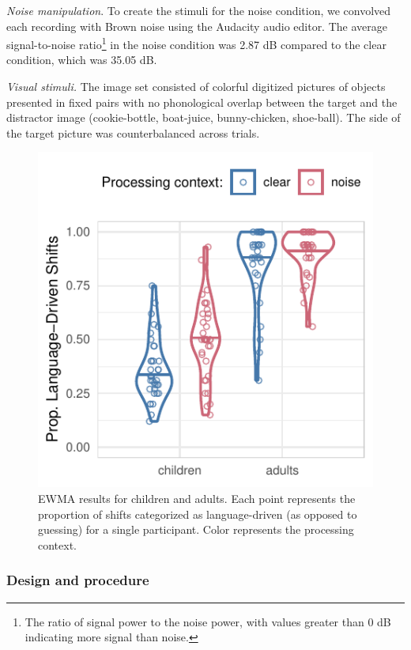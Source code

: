 \documentclass[10pt, letterpaper]{article}
\newenvironment{CodeChunk}{}{}
\begin{document}
\emph{Noise manipulation}. To create the stimuli for the noise
condition, we convolved each recording with Brown noise using the
Audacity audio editor. The average signal-to-noise ratio\footnote{The
  ratio of signal power to the noise power, with values greater than 0
  dB indicating more signal than noise.} in the noise condition was 2.87
dB compared to the clear condition, which was 35.05 dB.

\emph{Visual stimuli.} The image set consisted of colorful digitized
pictures of objects presented in fixed pairs with no phonological
overlap between the target and the distractor image (cookie-bottle,
boat-juice, bunny-chicken, shoe-ball). The side of the target picture
was counterbalanced across trials.

\begin{CodeChunk}
\begin{figure}[t]

{\centering \includegraphics[width=0.75\linewidth]{figs/ewma_violin_plot-1} 

}

\caption[EWMA results for children and adults]{EWMA results for children and adults. Each point represents the proportion of shifts categorized as language-driven (as opposed to guessing) for a single participant. Color represents the processing context.}\label{fig:ewma_violin_plot}
\end{figure}
\end{CodeChunk}

\hypertarget{design-and-procedure}{%
\subsubsection{Design and procedure}\label{design-and-procedure}}
\end{document}
